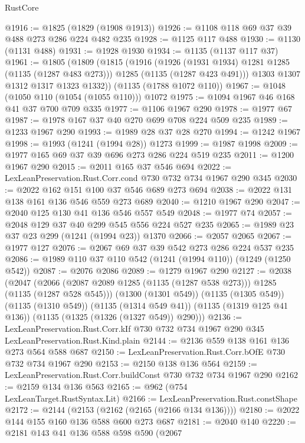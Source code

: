 \begin{lexlean}{RustCore}
\begin{coremodule}
@1916 := @1825 (@1829 (@1908 @1913))
@1926 := @1108 @118 @69 @37 @39 @488 @273 @286 @224 @482 @235
@1928 := @1125 @117 @488
@1930 := @1130 (@1131 @488)
@1931 := @1928 @1930
@1934 := @1135 (@1137 @117 @37)
@1961 := @1805
    (@1809
      (@1815
        (@1916
          (@1926 (@1931 @1934) @1281 @1285 (@1135 (@1287 @483 @273)))
          @1285
          (@1135 (@1287 @423 @491)))
        @1303
        @1307
        @1312
        @1317
        @1323
        @1332))
    (@1135 (@1788 @1072 @110))
@1967 := @1048 (@1050 @110 (@1054 (@1055 @110))) @1072
@1975 := @1094 @1967 @46 @168 @41 @37 @700 @709 @335
@1977 := @1106 @1967 @290
@1978 := @1977 @67
@1987 := @1978 @167 @37 @40 @270 @699 @708 @224 @509 @235
@1989 := @1233 @1967 @290
@1993 := @1989 @28 @37 @28 @270
@1994 := @1242 @1967
@1998 := @1993 (@1241 (@1994 @28)) @1273
@1999 := @1987 @1998
@2009 := @1977 @165 @69 @37 @39 @696 @273 @286 @224 @519 @235
@2011 := @1200 @1967 @290
@2015 := @2011 @165 @37 @546 @694
@2022 := LexLeanPreservation.Rust.Corr.cond @730 @732 @734 @1967 @290 @345
@2030 := @2022 @162 @151 @100 @37 @546 @689 @273 @694
@2038 := @2022 @131 @138 @161 @136 @546 @559 @273 @689
@2040 := @1210 @1967 @290
@2047 := @2040 @125 @130 @41 @136 @546 @557 @549
@2048 := @1977 @74
@2057 := @2048 @129 @37 @40 @299 @545 @556 @224 @527 @235
@2065 := @1989 @23 @37 @23 @299 (@1241 (@1994 @23)) @1370
@2066 := @2057 @2065
@2067 := @1977 @127
@2076 := @2067 @69 @37 @39 @542 @273 @286 @224 @537 @235
@2086 := @1989 @110 @37 @110 @542 (@1241 (@1994 @110)) (@1249 (@1250 @542))
@2087 := @2076 @2086
@2089 := @1279 @1967 @290
@2127 := @2038
    (@2047
      (@2066 (@2087 @2089 @1285 (@1135 (@1287 @538 @273))) @1285 (@1135 (@1287 @528 @545)))
      (@1300 (@1301 @549))
      (@1135 (@1305 @549))
      (@1135 (@1310 @549))
      (@1135 (@1314 @549 @41))
      (@1135 (@1319 @125 @41 @136))
      (@1135 (@1325 (@1326 (@1327 @549)) @290)))
@2136 := LexLeanPreservation.Rust.Corr.kIf
    @730
    @732
    @734
    @1967
    @290
    @345
    LexLeanPreservation.Rust.Kind.plain
@2144 := @2136 @559 @138 @161 @136 @273 @564 @588 @687
@2150 := LexLeanPreservation.Rust.Corr.bOfE @730 @732 @734 @1967 @290
@2153 := @2150 @138 @136 @564
@2159 := LexLeanPreservation.Rust.Corr.buildConst @730 @732 @734 @1967 @290
@2162 := @2159 @134 @136 @563
@2165 := @962 (@754 LexLeanTarget.RustSyntax.Lit)
@2166 := LexLeanPreservation.Rust.constShape
@2172 := @2144 (@2153 (@2162 (@2165 (@2166 @134 @136))))
@2180 := @2022 @144 @155 @160 @136 @588 @600 @273 @687
@2181 := @2040 @140
@2220 := @2181
    @143
    @41
    @136
    @588
    @598
    @590
    (@2067

\end{coremodule}
\end{lexlean}
